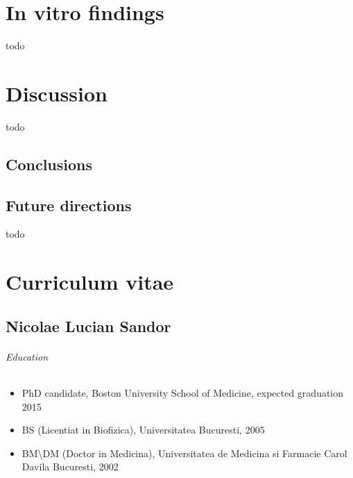 \documentclass[12pt,english]{report}\usepackage[]{graphicx}\usepackage[]{color}
\begin{document}
\chapter{In vitro findings}

todo

\begin{singlespace}
\pagebreak{}
\end{singlespace}


\chapter{Discussion}

todo


\section{Conclusions}


\section{Future directions}

todo

\begin{singlespace}
\pagebreak{}
\end{singlespace}




\begin{singlespace}
\pagebreak{}
\end{singlespace}


\chapter{Curriculum vitae}


\section*{Nicolae Lucian Sandor}


\subparagraph*{Education}
\begin{itemize}
\item PhD candidate, Boston University School of Medicine, expected graduation
2015
\item BS (Licentiat in Biofizica), Universitatea Bucuresti, 2005
\item BM\textbackslash{}DM (Doctor in Medicina), Universitatea de Medicina
si Farmacie Carol Davila Bucuresti, 2002
\end{itemize}
\end{document}

